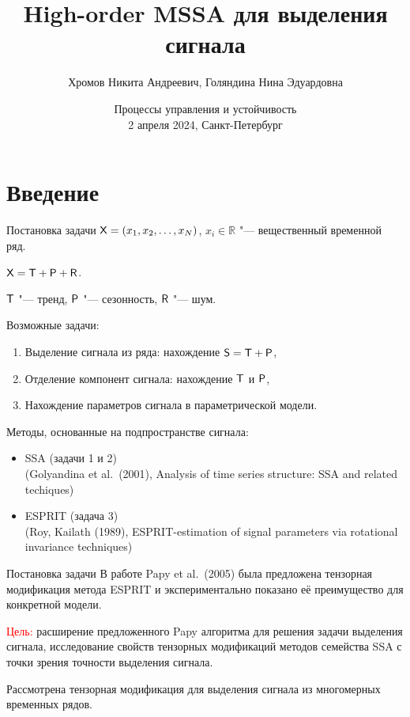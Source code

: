 \documentclass[ucs, notheorems, handout]{beamer}
\title[HO-MSSA]{High-order MSSA для выделения сигнала}
\author[Хромов Н.А., Голяндина Н.Э.]{Хромов Никита Андреевич, Голяндина Нина Эдуардовна}
\institute[Санкт-Петербургский Государственный Университет]{%
    \small
    Санкт-Петербургский государственный университет\\
    Математико-механический факультет\\
    Кафедра статистического моделирования\\
    \vspace{1.25cm}
}
\date{Процессы управления и устойчивость\\
2 апреля 2024, Санкт-Петербург}
\newcommand{\bluetext}[1]{{\usebeamercolor[fg]{bluetext_color}#1}}
\begin{document}
    \begin{frame}[plain]
        \titlepage

    \end{frame}


    \section{Введение}\label{sec:introduction}
    \begin{frame}{Постановка задачи}
        $\mathsf{X}=(x_1, x_2,\ldots, x_N)$, $x_i\in \mathbb{R}$ "--- вещественный временной ряд.

        $\mathsf{X} = \mathsf{T} + \mathsf{P} + \mathsf{R}$.

        $\mathsf{T}$ "--- тренд, $\mathsf{P}$ "--- сезонность, $\mathsf{R}$ "--- шум.
        \vspace{0.3cm}

        \bluetext{Возможные задачи:}
        \begin{enumerate}
            \item Выделение сигнала из ряда: нахождение $\mathsf{S} = \mathsf{T} + \mathsf{P}$,
            \item Отделение компонент сигнала: нахождение $\mathsf{T}$ и $\mathsf{P}$,
            \item Нахождение параметров сигнала в параметрической модели.
        \end{enumerate}

        \vspace{0.3cm}
        Методы, основанные на подпространстве сигнала:
        \begin{itemize}
            \item SSA (задачи 1 и 2)
            \\(Golyandina et al.\ (2001), Analysis of time series structure: SSA and related techiques)
            \item ESPRIT (задача 3)
            \\(Roy, Kailath (1989), ESPRIT-estimation of signal parameters via rotational invariance techniques)
        \end{itemize}
    \end{frame}

    \begin{frame}{Постановка задачи}
        В работе Papy et al.\ (2005) была предложена тензорная модификация метода ESPRIT и экспериментально показано её
        преимущество для конкретной модели.

        \medskip

        \textcolor{red}{Цель:} расширение предложенного Papy алгоритма для решения задачи выделения сигнала,
        исследование свойств тензорных модификаций методов семейства SSA с точки зрения
        точности выделения сигнала.

        Рассмотрена тензорная модификация для выделения сигнала из многомерных временных рядов.
    \end{frame}
\end{document}
